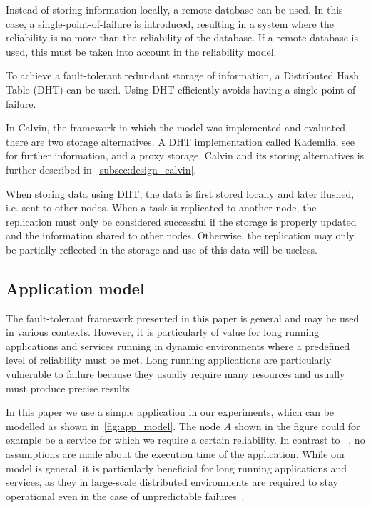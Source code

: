 \documentclass{cslthse-msc}
\begin{document}
Instead of storing information locally, a remote database can be used. In this case, a single-point-of-failure is introduced, resulting in a system where the reliability is no more than the reliability of the database. If a remote database is used, this must be taken into account in the reliability model.

To achieve a fault-tolerant redundant storage of information, a Distributed Hash Table (DHT) can be used. Using DHT efficiently avoids having a single-point-of-failure. 

In Calvin, the framework in which the model was implemented and evaluated, there are two storage alternatives. A DHT implementation called Kademlia, see~\cite{kademlia} for further information, and a proxy storage. Calvin and its storing alternatives is further described in~\cref{subsec:design_calvin}.

When storing data using DHT, the data is first stored locally and later flushed, i.e. sent to other nodes. When a task is replicated to another node, the replication must only be considered successful if the storage is properly updated and the information shared to other nodes. Otherwise, the replication may only be partially reflected in the storage and use of this data will be useless. 

\subsection{Application model} \label{subsec:design_app_model}
The fault-tolerant framework presented in this paper is general and may be used in various contexts. However, it is particularly of value for long running applications and services running in dynamic environments where a predefined level of reliability must be met. Long running applications are particularly vulnerable to failure because they usually require many resources and usually must produce precise results~\cite{relGridSystems}.

In this paper we use a simple application in our experiments, which can be modelled as shown in~\cref{fig:app_model}. The node $A$ shown in the figure could for example be a service for which we require a certain reliability. In contrast to ~\cite{algoOptTimeMaxRel, optTaskAllocationForMaxRel, taskAllocation, taskAllocationSwarm, algoMaxRelEndToEndConstraint, algoMinExTime, schedReplicas}, no assumptions are made about the execution time of the application. While our model is general, it is particularly beneficial for long running applications and services, as they in large-scale distributed environments are required to stay operational even in the case of unpredictable failures~\cite{imprRelAdaptRL}.
\end{document}
